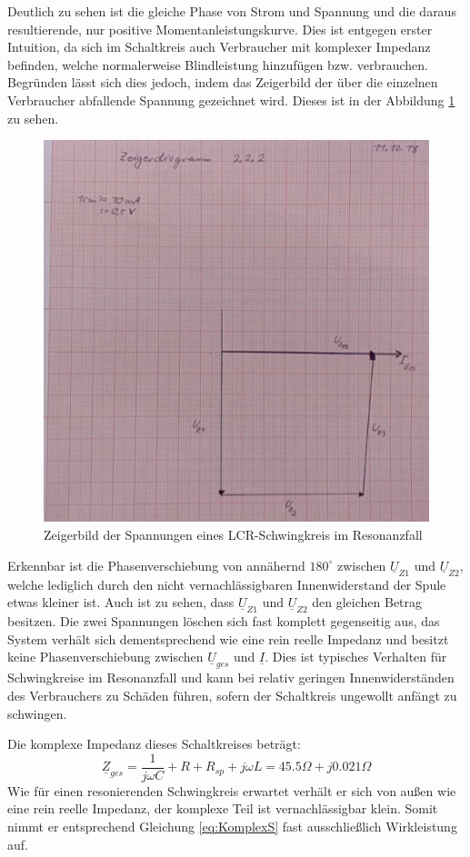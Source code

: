 Deutlich zu sehen ist die gleiche Phase von Strom und Spannung und die daraus resultierende, nur positive Momentanleistungskurve. Dies ist entgegen erster Intuition, da sich im Schaltkreis auch Verbraucher mit komplexer Impedanz befinden, welche normalerweise Blindleistung hinzufügen bzw. verbrauchen.
Begründen lässt sich dies jedoch, indem das Zeigerbild der über die einzelnen Verbraucher abfallende Spannung gezeichnet wird. Dieses ist in der Abbildung \ref{fig:ZeigerbildResonanz} zu sehen.

\begin{figure}[H]
\centering
\includegraphics[width=0.7\linewidth]{Images/Zeigerdiagramm2-2-2.jpg}
\caption{Zeigerbild der Spannungen eines LCR-Schwingkreis im Resonanzfall}
\label{fig:ZeigerbildResonanz}
\end{figure}

Erkennbar ist die Phasenverschiebung von annähernd $180^\circ$ zwischen $\underline{U}_{Z1} \mbox{ und } \underline{U}_{Z2}$, welche lediglich durch den nicht vernachlässigbaren Innenwiderstand der Spule etwas kleiner ist. Auch ist zu sehen, dass $\underline{U}_{Z1} \mbox{ und } \underline{U}_{Z2}$ den gleichen Betrag besitzen. Die zwei Spannungen löschen sich fast komplett gegenseitig aus, das System verhält sich dementsprechend wie eine rein reelle Impedanz und besitzt keine Phasenverschiebung zwischen $\underline{U}_{ges}$ und $\underline{I}$. Dies ist typisches Verhalten für Schwingkreise im Resonanzfall und kann bei relativ geringen Innenwiderständen des Verbrauchers zu Schäden führen, sofern der Schaltkreis ungewollt anfängt zu schwingen.

Die komplexe Impedanz dieses Schaltkreises beträgt:
\begin{equation}
\underline{Z}_{ges} = \frac{1}{j\omega C} + R + R_{sp} + j\omega L = 45.5\Omega + j0.021\Omega
\end{equation}
Wie für einen resonierenden Schwingkreis erwartet verhält er sich von außen wie eine rein reelle Impedanz, der komplexe Teil ist vernachlässigbar klein. Somit nimmt er entsprechend Gleichung \eqref{eq:KomplexS} fast ausschließlich Wirkleistung auf.
